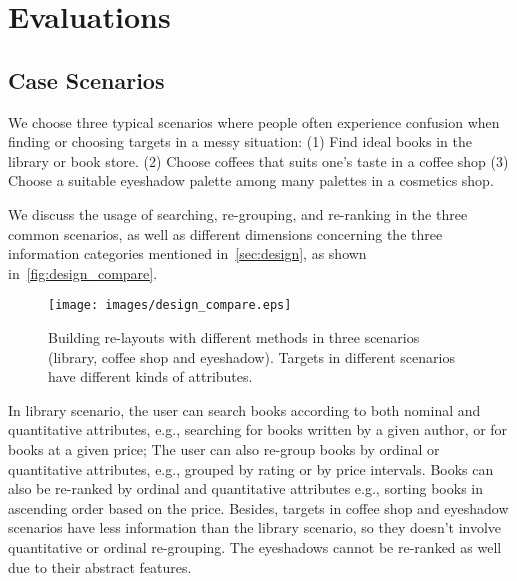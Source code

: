 \section{Evaluations}
\label{sec:evaluation}

\subsection{Case Scenarios}
We choose three typical scenarios where people often experience confusion
when finding or choosing targets in a messy situation:
(1) Find ideal books in the library or book store.
(2) Choose coffees that suits one's taste in a coffee shop
(3) Choose a suitable eyeshadow palette among many palettes in a cosmetics shop.

We discuss the usage of searching, re-grouping, and re-ranking in the three common scenarios,
as well as different dimensions concerning the three information categories mentioned in~\autoref{sec:design},
as shown in~\autoref{fig:design_compare}.


\begin{figure}[htp]
    \centering
    \texttt{[image: images/design\_compare.eps]}
    \caption{
    Building re-layouts with different methods in three scenarios (library, coffee shop and eyeshadow).
    Targets in different scenarios have different kinds of attributes.
    }
    \label{fig:design_compare}
\end{figure}

In library scenario, the user can search books according to both nominal and quantitative attributes,
e.g., searching for books written by a given author, or for books at a given price;
The user can also re-group books by ordinal or quantitative attributes,
e.g., grouped by rating or by price intervals.
Books can also be re-ranked by ordinal and quantitative attributes
e.g., sorting books in ascending order based on the price.
Besides,
targets in coffee shop and eyeshadow scenarios have less information than the library scenario,
so they doesn’t involve quantitative or ordinal re-grouping.
The eyeshadows cannot be re-ranked as well due to their abstract features.






